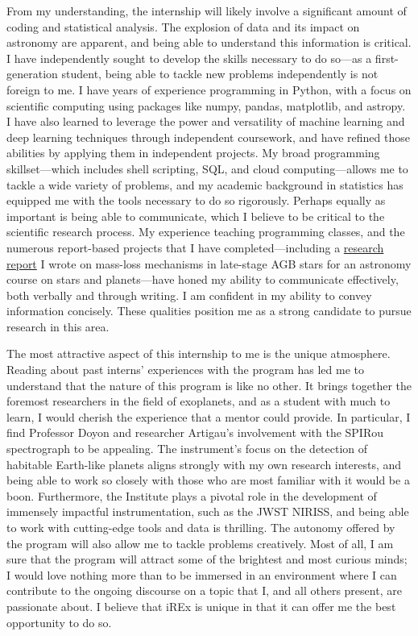 \documentclass[10pt]{res}
\begin{document}
\begin{resume}
From my understanding, the internship will likely involve a significant amount of coding and statistical analysis. The explosion of data and its impact on astronomy are apparent, and being able to understand this information is critical. I have independently sought to develop the skills necessary to do so—as a first-generation student, being able to tackle new problems independently is not foreign to me. I have years of experience programming in Python, with a focus on scientific computing using packages like numpy, pandas, matplotlib, and astropy. I have also learned to leverage the power and versatility of machine learning and deep learning techniques through independent coursework, and have refined those abilities by applying them in independent projects. My broad programming skillset—which includes shell scripting, SQL, and cloud computing—allows me to tackle a wide variety of problems, and my academic background in statistics has equipped me with the tools necessary to do so rigorously. Perhaps equally as important is being able to communicate, which I believe to be critical to the scientific research process. My experience teaching programming classes, and the numerous report-based projects that I have completed—including a \href{https://github.com/al-jshen/AST221/blob/master/report/rpt.pdf}{research report} I wrote on mass-loss mechanisms in late-stage AGB stars for an astronomy course on stars and planets—have honed my ability to communicate effectively, both verbally and through writing. I am confident in my ability to convey information concisely. These qualities position me as a strong candidate to pursue research in this area. 

The most attractive aspect of this internship to me is the unique atmosphere. Reading about past interns' experiences with the program has led me to understand that the nature of this program is like no other. It brings together the foremost researchers in the field of exoplanets, and as a student with much to learn, I would cherish the experience that a mentor could provide. In particular, I find Professor Doyon and researcher Artigau's involvement with the SPIRou spectrograph to be appealing. The instrument's focus on the detection of habitable Earth-like planets aligns strongly with my own research interests, and being able to work so closely with those who are most familiar with it would be a boon. Furthermore, the Institute plays a pivotal role in the development of immensely impactful instrumentation, such as the JWST NIRISS, and being able to work with cutting-edge tools and data is thrilling. The autonomy offered by the program will also allow me to tackle problems creatively. Most of all, I am sure that the program will attract some of the brightest and most curious minds; I would love nothing more than to be immersed in an environment where I can contribute to the ongoing discourse on a topic that I, and all others present, are passionate about. I believe that iREx is unique in that it can offer me the best opportunity to do so. 


\end{resume}
\end{document}
